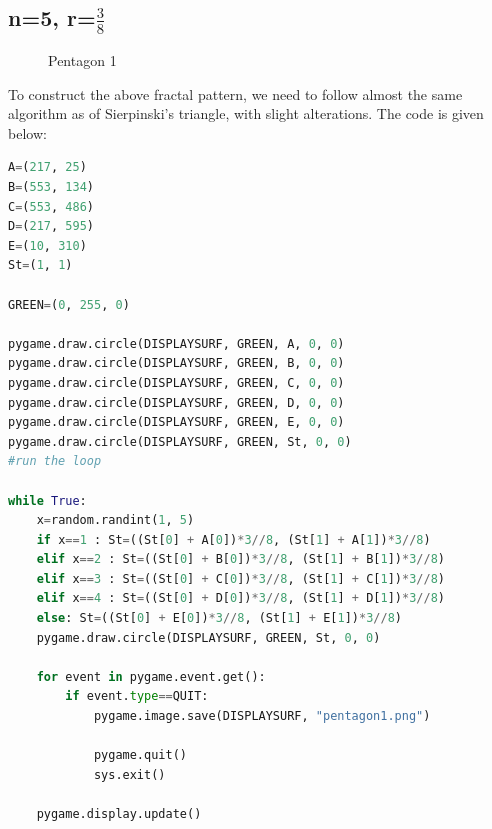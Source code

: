 \documentclass{article}
\begin{document}
\subsection{n=5, r=$\frac{3}{8}$}
\begin{figure}[H]
\centering 
\noindent{}%
\caption{Pentagon 1}
\end{figure}

To construct the above fractal pattern, we need to follow almost the same algorithm as of Sierpinski's triangle, with slight alterations. The code is given below:
\begin{lstlisting}[language=Python, frame=single]
A=(217, 25)
B=(553, 134)
C=(553, 486)
D=(217, 595)
E=(10, 310)
St=(1, 1)

GREEN=(0, 255, 0)

pygame.draw.circle(DISPLAYSURF, GREEN, A, 0, 0)
pygame.draw.circle(DISPLAYSURF, GREEN, B, 0, 0)
pygame.draw.circle(DISPLAYSURF, GREEN, C, 0, 0)
pygame.draw.circle(DISPLAYSURF, GREEN, D, 0, 0)
pygame.draw.circle(DISPLAYSURF, GREEN, E, 0, 0)
pygame.draw.circle(DISPLAYSURF, GREEN, St, 0, 0)
#run the loop

while True:
    x=random.randint(1, 5)
    if x==1 : St=((St[0] + A[0])*3//8, (St[1] + A[1])*3//8)
    elif x==2 : St=((St[0] + B[0])*3//8, (St[1] + B[1])*3//8)
    elif x==3 : St=((St[0] + C[0])*3//8, (St[1] + C[1])*3//8)
    elif x==4 : St=((St[0] + D[0])*3//8, (St[1] + D[1])*3//8)
    else: St=((St[0] + E[0])*3//8, (St[1] + E[1])*3//8)
    pygame.draw.circle(DISPLAYSURF, GREEN, St, 0, 0)
    
    for event in pygame.event.get():
        if event.type==QUIT:
            pygame.image.save(DISPLAYSURF, "pentagon1.png")
    
            pygame.quit()
            sys.exit()

    pygame.display.update()
\end{lstlisting}
\end{document}

